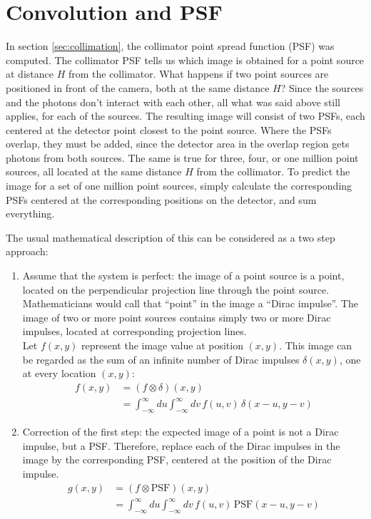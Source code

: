 \newpage
\section{Convolution and PSF} \label{app:convolution}
In section \ref{sec:collimation}, the collimator point spread function (PSF)
was computed. The collimator PSF tells us which image is obtained for a point
source at distance $H$ from the collimator. What happens if two point sources
are positioned in front of the camera, both at the same distance $H$? Since
the sources and the photons don't interact with each other, all what was said
above still applies, for each of the sources. The resulting image will consist
of two PSFs, each centered at the detector point closest to the point
source. Where the PSFs overlap, they must be added, since the detector area
in the overlap region gets photons from both sources. The same is true for
three, four, or one million point sources, all located at the same distance
$H$ from the collimator. To predict the image for a set of one million point
sources, simply calculate the corresponding PSFs centered at the
corresponding positions on the detector, and sum everything.

The usual mathematical description of this can be considered as a two step
approach:
\begin{enumerate}
\item
Assume that the system is perfect: the image of a point source is a point,
located on the perpendicular projection line through the point source.
Mathematicians would call that ``point'' in the image a ``Dirac impulse''.
The image of two or more point sources contains simply two or more Dirac
impulses, located at corresponding projection lines.\\
%
Let $f(x,y)$ represent the image value at position $(x,y)$. This image
can be regarded as the sum of an infinite number of Dirac impulses
$\delta(x,y)$, one at every location $(x,y)$:
\begin{align}
f(x,y) &= (f \otimes \delta) (x,y)\\
       &= \int_{-\infty}^{\infty} du \int_{-\infty}^{\infty} dv \, f(u,v) \, \delta(x-u, y-v)
\end{align}

\item
Correction of the first step: the expected image of a point is not a Dirac
impulse, but a PSF. Therefore, replace each of the Dirac impulses in the image
by the corresponding PSF, centered at the position of the Dirac impulse.
\begin{align}
g(x,y) &= (f \otimes \mbox{PSF}) (x,y)\\
       &= \int_{-\infty}^{\infty} du \int_{-\infty}^{\infty} dv \, f(u,v) \, \mbox{PSF}(x-u, y-v)
\end{align}
\end{enumerate}

